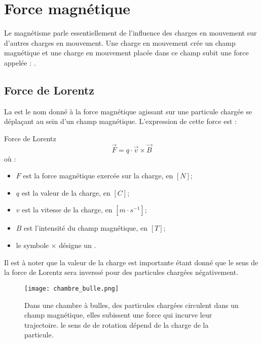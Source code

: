 \chapter{Force magnétique}
Le magnétisme parle essentiellement de l'influence des charges en mouvement sur d'autres charges en mouvement. Une charge en mouvement crée un champ magnétique et une charge en mouvement placée dans ce champ subit une force appelée : .
\section{Force de Lorentz}
La   est le nom donné à la force magnétique agissant sur une particule chargée se déplaçant au sein d'un champ magnétique. L'expression de cette force est :
\begin{encadre_equation*}{Force de Lorentz}
    \begin{equation}
        \vec{F}=q \cdot \vec{v} \times \vec{B}
    \end{equation} où :
    \begin{itemize}[label=\textbullet]
        \item \(F\) est la force magnétique exercée sur la charge, en \([N]\);
        \item \(q\) est la valeur de la charge, en \([C]\);
        \item \(v\) est la vitesse de la charge, en \([m \cdot s^{-1}]\);
        \item \(B\) est l'intensité du champ magnétique, en \([T]\);
        \item le symbole  \(\times\) désigne un .
    \end{itemize}
\end{encadre_equation*}
Il est à noter que la valeur de la charge est importante étant donné que le sens de la force de Lorentz sera inverssé pour des particules chargées négativement.

\begin{figure}[h]
    \centering
    \texttt{[image: chambre\_bulle.png]}
    \caption{Dans une chambre à bulles, des particules chargées circulent dans un champ magnétique, elles subissent une force qui incurve leur trajectoire. le sens de de rotation dépend de la charge de la particule.}
    \label{chambre_bulle}
\end{figure}

\newpage

